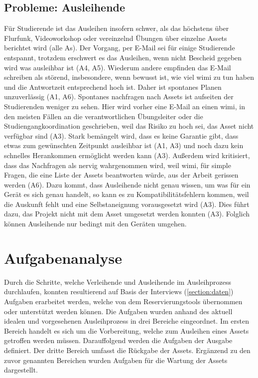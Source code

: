 \subsection{Probleme: Ausleihende}
Für Studierende ist das Ausleihen insofern schwer, als das höchstens über Flurfunk, Videoworkshop
oder vereinzelnd Übungen über einzelne Assets berichtet wird (alle As). Der Vorgang, per E-Mail sei
für einige Studierende entspannt, trotzdem erschwert es das Ausleihen, wenn nicht Bescheid gegeben
wird was ausleihbar ist (A4, A5). Wiederum andere empfinden das E-Mail schreiben als störend,
insbesondere, wenn bewusst ist, wie viel \ac{wimi} zu tun haben und die Antwortzeit entsprechend
hoch ist. Daher ist spontanes Planen unzuverlässig (A1, A6). Spontanes nachfragen nach Assets ist
aufseiten der Studierenden weniger zu sehen. Hier wird vorher eine E-Mail an einen \ac{wimi}, in den
meisten Fällen an die verantwortlichen Übungsleiter oder die Studiengangkoordination geschrieben,
weil das Risiko zu hoch sei, das Asset nicht verfügbar sind (A3). Stark bemängelt wird, dass
es keine Garantie gibt, dass etwas zum gewünschten Zeitpunkt ausleihbar ist (A1, A3) und noch dazu
kein schnelles Herankommen ermöglicht werden kann (A3). Außerdem wird kritisiert, dass das
Nachfragen als nervig wahrgenommen wird, weil \ac{wimi}, für simple Fragen, die eine Liste der
Assets beantworten würde, aus der Arbeit gerissen werden (A6). Dazu kommt, dass Ausleihende nicht
genau wissen, um was für ein Gerät es sich genau handelt, so kann es zu Kompatibilitätsfehlern
kommen, weil die Auskunft fehlt und eine Selbstaneignung vorausgesetzt wird (A3). Dies führt dazu,
das Projekt nicht mit dem Asset umgesetzt werden konnten (A3). Folglich können Ausleihende nur
bedingt mit den Geräten umgehen.


\section{Aufgabenanalyse}
\label{section:aufgaben}
Durch die Schritte, welche Verleihende und Ausleihende im Ausleihprozess durchlaufen, konnten
resultierend auf Basis der Interviews (\ref{section:daten}) Aufgaben erarbeitet werden, welche von
dem Reservierungstools übernommen oder unterstützt werden können. Die Aufgaben wurden anhand des
aktuell idealen und vorgesehenen Ausleihprozess in drei Bereiche eingeordnet. Im ersten Bereich
handelt es sich um die Vorbereitung, welche zum Ausleihen eines Assets getroffen werden müssen.
Darauffolgend werden die Aufgaben der Ausgabe definiert. Der dritte Bereich umfasst die Rückgabe der
Assets. Ergänzend zu den zuvor genannten Bereichen wurden Aufgaben für die Wartung der Assets
dargestellt.

